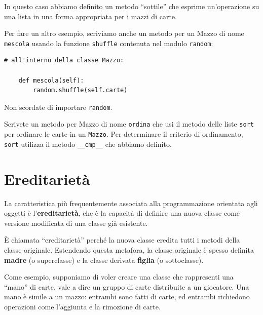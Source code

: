 \documentclass[10pt]{book}
\begin{document}
In questo caso abbiamo definito un metodo ``sottile'' che esprime un'operazione su una lista in una forma appropriata per i mazzi di carte.

Per fare un altro esempio, scriviamo anche un metodo per un Mazzo di nome {\tt mescola} usando la funzione {\tt shuffle} contenuta nel modulo {\tt random}:

\begin{verbatim}
# all'interno della classe Mazzo:
            
    def mescola(self):
        random.shuffle(self.carte)
\end{verbatim}
%
Non scordate di importare {\tt random}.

\vspace{0.2in}
\begin{exercise}

Scrivete un metodo per Mazzo di nome {\tt ordina} che usi il metodo delle liste {\tt sort} per ordinare le carte in un {\tt Mazzo}. Per determinare il criterio di ordinamento, {\tt sort} utilizza il metodo \verb"__cmp__" che abbiamo definito.
\end{exercise}



\section{Ereditarietà}

La caratteristica più frequentemente associata alla programmazione orientata agli oggetti è l'{\bf ereditarietà}, che è la capacità di definire una nuova classe come versione modificata di una classe già esistente.

È chiamata ``ereditarietà'' perché la nuova classe eredita tutti i metodi della classe originale. Estendendo questa metafora, la classe originale è spesso definita {\bf madre} (o superclasse) e la classe derivata {\bf figlia} (o sottoclasse).

Come esempio, supponiamo di voler creare una classe che rappresenti una ``mano'' di carte, vale a dire un gruppo di carte distribuite a un giocatore. Una mano è simile a un mazzo: entrambi sono fatti di carte, ed entrambi richiedono operazioni come l'aggiunta e la rimozione di carte.
\end{document}
